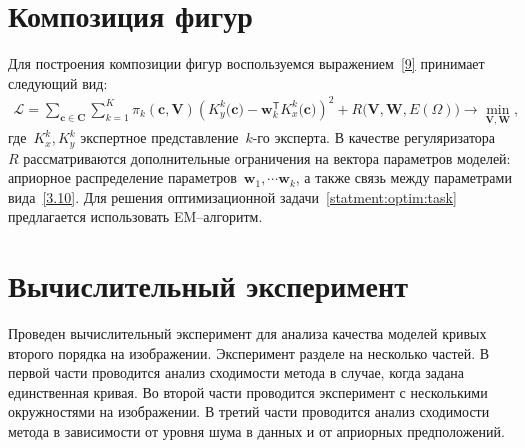 \documentclass[12pt, twoside]{article}
\numberwithin{equation}{section}
\begin{document}
\section{Композиция фигур}
Для построения композиции фигур воспользуемся выражением~\eqref{9} принимает следующий вид:
\begin{equation} 
\label{statment:optim:task}
\begin{aligned}
\mathcal{L} = \sum\limits_{\mathbf{c} \in \mathbf{C}} \sum\limits_{k = 1}^{K} \pi_k(\mathbf{c}, \mathbf{V})\left(K^{k}_y\bigr(\mathbf{c}\bigr) - \mathbf{w}_k^{\mathsf{T}}K^{k}_x\bigr(\mathbf{c}\bigr)\right)^2 + R\bigl(\mathbf{V}, \mathbf{W}, E(\Omega)\bigr) \rightarrow \min_{\mathbf{V}, \mathbf{W}},
\end{aligned}
\end{equation} 
где~$K^{k}_x, K^{k}_y$ экспертное представление~$k$-го эксперта. В качестве регуляризатора~$R$ рассматриваются дополнительные ограничения на вектора параметров моделей: априорное распределение параметров~$\mathbf{w}_1, \cdots \mathbf{w}_k$, а также связь между параметрами вида~\eqref{3.10}. Для решения оптимизационной задачи~\eqref{statment:optim:task} предлагается использовать EM--алгоритм.

\section{Вычислительный эксперимент}
Проведен вычислительный эксперимент для анализа качества моделей кривых второго порядка на изображении. Эксперимент разделе на несколько частей. В первой части проводится анализ сходимости метода в случае, когда задана единственная кривая. Во второй части проводится эксперимент с несколькими окружностями на изображении. В третий части проводится анализ сходимости метода в зависимости от уровня шума в данных и от априорных предположений.
\end{document}
